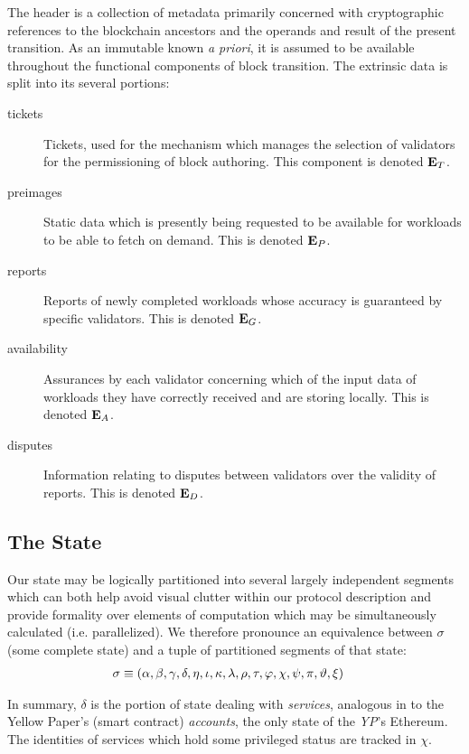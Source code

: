 The header is a collection of metadata primarily concerned with cryptographic references to the blockchain ancestors and the operands and result of the present transition. As an immutable known \emph{a priori}, it is assumed to be available throughout the functional components of block transition. The extrinsic data is split into its several portions:

\begin{description}
  \item[tickets] Tickets, used for the mechanism which manages the selection of validators for the permissioning of block authoring. This component is denoted $\mathbf{E}_T$.
  \item[preimages] Static data which is presently being requested to be available for workloads to be able to fetch on demand. This is denoted $\mathbf{E}_P$.
  \item[reports] Reports of newly completed workloads whose accuracy is guaranteed by specific validators. This is denoted $\mathbf{E}_G$.
  \item[availability] Assurances by each validator concerning which of the input data of workloads they have correctly received and are storing locally. This is denoted $\mathbf{E}_A$.
  \item[disputes] Information relating to disputes between validators over the validity of reports. This is denoted $\mathbf{E}_D$.
\end{description}

\subsection{The State}

Our state may be logically partitioned into several largely independent segments which can both help avoid visual clutter within our protocol description and provide formality over elements of computation which may be simultaneously calculated (i.e. parallelized). We therefore pronounce an equivalence between $\sigma$ (some complete state) and a tuple of partitioned segments of that state:
\begin{align}\label{eq:statecomposition}
  \sigma &\equiv (\alpha, \beta, \gamma, \delta, \eta, \iota, \kappa, \lambda, \rho, \tau, \varphi, \chi, \psi, \pi, \vartheta, \xi)
\end{align}

In summary, $\delta$ is the portion of state dealing with \emph{services}, analogous in \Jam to the Yellow Paper's (smart contract) \emph{accounts}, the only state of the \emph{YP}'s Ethereum. The identities of services which hold some privileged status are tracked in $\chi$.

